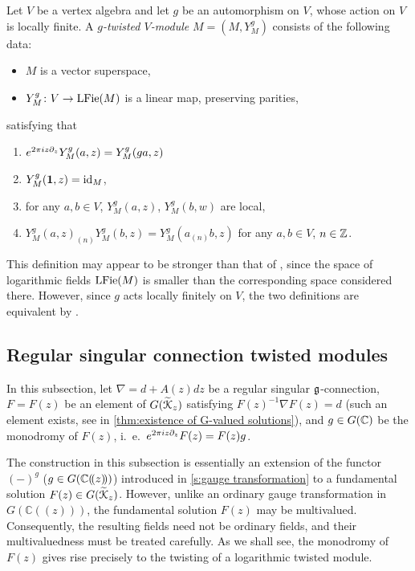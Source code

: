 \documentclass[final,reqno]{amsart}
\begin{document}
\begin{dfn}
    Let $V$ be a vertex algebra and let $g$ be an automorphism on $V$, whose action on $V$ is locally finite.  A \emph{$g$-twisted $V$-module} $M=(M,Y^g_M)$ consists of the following data:
    \begin{itemize}
        \item 
        $M$ is a vector superspace,
        \item 
        $Y^g_M\colon V\to \operatorname{LFie}(M)$ is a linear map, preserving parities,
    \end{itemize}
    satisfying that
    \begin{enumerate}
        \item 
        $e^{2\pi iz\partial_z}Y^g_M(a,z)=Y^g_M(ga,z)$
        \item 
        $Y^g_M(\mathbf{1},z)=\operatorname{id}_M$,
        \item
        for any $a,b\in V$, $Y^g_M(a,z)$, $Y^g_M(b,w)$ are local,
        \item 
        $Y^g_M(a,z)_{(n)}Y^g_M(b,z)=Y^g_M(a_{(n)}b,z)$ for any $a,b\in V$, $n\in\mathbb{Z}$.
    \end{enumerate}
\end{dfn}

\begin{rmk}
    This definition may appear to be stronger than that of \cite{Bak16}, since the space of logarithmic fields $\operatorname{LFie}(M)$ is smaller than the corresponding space considered there. However, since $g$ acts locally finitely on $V$, the two definitions are equivalent by \cite[Lemma~4.8]{Bak16}.  
\end{rmk}


\subsection{Regular singular connection twisted modules}
In this subsection, let $\nabla=d+A(z)dz$ be a regular singular $\mathfrak{g}$-connection, $F=F(z)$ be an element of $G(\widetilde{\EuScript{K}}_z)$ satisfying $F(z)^{-1}\nabla F(z)=d$ (such an element exists, see in \cref{thm:existence of G-valued solutions}), and $g\in G(\mathbb{C})$ be the monodromy of $F(z)$, i.\ e.\ $e^{2\pi i z\partial_z}F(z)=F(z)g$.

The construction in this subsection is essentially an extension of the functor $(-)^g$ ($g\in G(\mathbb{C}(\!( z )\!))$) introduced in \cref{s:gauge transformation} to a fundamental solution $F(z)\in G(\widetilde{\EuScript{K}}_z)$. However, unlike an ordinary gauge transformation in $G(\mathbb C((z)))$, the fundamental solution $F(z)$ may be multivalued. Consequently, the resulting fields need not be ordinary fields, and their multivaluedness must be treated carefully. As we shall see, the monodromy of $F(z)$ gives rise precisely to the twisting of a logarithmic twisted module.
\end{document}
